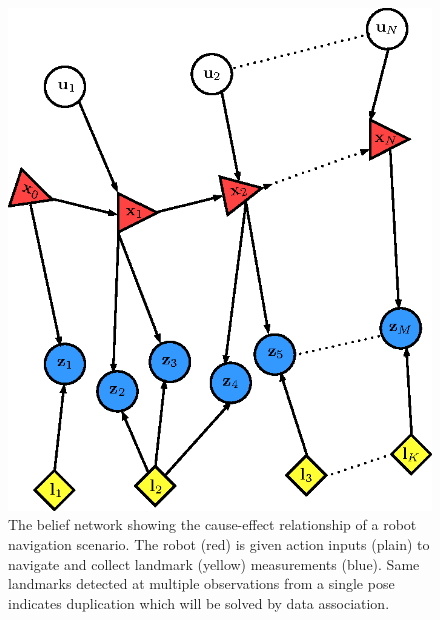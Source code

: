 %
\begin{figure}
\centering
\includegraphics{Chapters/figures2/single_robot_belief_network}
\caption{The belief network showing the cause-effect relationship of a robot navigation scenario. The robot (red) is given action inputs (plain) to navigate and collect landmark (yellow) measurements (blue). Same landmarks detected at multiple observations from a single pose indicates duplication which will be solved by data association.}
\label{fig:single_bel_net}
\end{figure}
